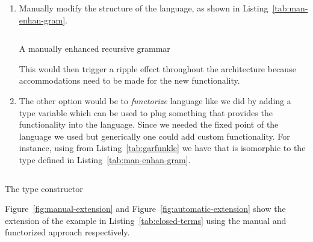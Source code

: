 \documentclass[thesis-solanki.tex]{subfiles}
\begin{document}
\begin{enumerate}
\item Manually modify the structure of the language, as shown in Listing~\ref{tab:man-enhan-gram}.
  \begin{code-list}[H]
\begin{singlespace}
\inputminted{haskell}{haskell-proto1-man-enhan-gram.hs}
\end{singlespace}
    \caption{A manually enhanced recursive grammar}
    \label{tab:man-enhan-gram}
  \end{code-list}

  This would then trigger a ripple effect throughout the architecture because accommodations need to be made for
  the new functionality.

\item
  The other option would be to \textit{functorize} language like we did by adding a type variable which can be used
  to plug something that provides the functionality into the language.
  Since we needed the fixed point of the language we used  but generically one could add
  custom functionality.
  For instance, using  from Listing~\ref{tab:garfunkle} we have 
    that is isomorphic to the type defined in
  Listing~\ref{tab:man-enhan-gram}.

\end{enumerate}



\begin{code-list}[H]
\begin{singlespace}
\inputminted{haskell}{haskell-proto1-garfunkle.hs}
\end{singlespace}
  \caption{The  type constructor}
  \label{tab:garfunkle}
\end{code-list}

Figure~\ref{fig:manual-extension} and Figure~\ref{fig:automatic-extension} show the extension of the example in
Listing~\ref{tab:closed-terms} using the manual and functorized approach respectively.
\end{document}
